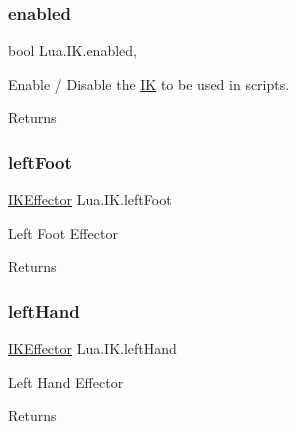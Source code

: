 \subsubsection{\texorpdfstring{enabled}{enabled}}
{\footnotesize\ttfamily bool Lua.\+I\+K.\+enabled\hspace{0.3cm}{\ttfamily [get]}, {\ttfamily [set]}}



Enable / Disable the \mbox{\hyperlink{class_lua_1_1_i_k}{IK}} to be used in scripts. 

\begin{DoxyReturn}{Returns}

\end{DoxyReturn}
\mbox{\label{class_lua_1_1_i_k_a8cea34c6258871a550fc9d56f8facea1}} 
\subsubsection{\texorpdfstring{leftFoot}{leftFoot}}
{\footnotesize\ttfamily \mbox{\hyperlink{class_lua_1_1_i_k_effector}{I\+K\+Effector}} Lua.\+I\+K.\+left\+Foot\hspace{0.3cm}{\ttfamily [get]}}



Left Foot Effector 

\begin{DoxyReturn}{Returns}

\end{DoxyReturn}
\mbox{\label{class_lua_1_1_i_k_a88ba05bd1557a61e1f69e21fd172641c}} 
\subsubsection{\texorpdfstring{leftHand}{leftHand}}
{\footnotesize\ttfamily \mbox{\hyperlink{class_lua_1_1_i_k_effector}{I\+K\+Effector}} Lua.\+I\+K.\+left\+Hand\hspace{0.3cm}{\ttfamily [get]}}



Left Hand Effector 

\begin{DoxyReturn}{Returns}

\end{DoxyReturn}
\mbox{\label{class_lua_1_1_i_k_a0868dad53aa0ea22b3554edc766ee8bc}} 
